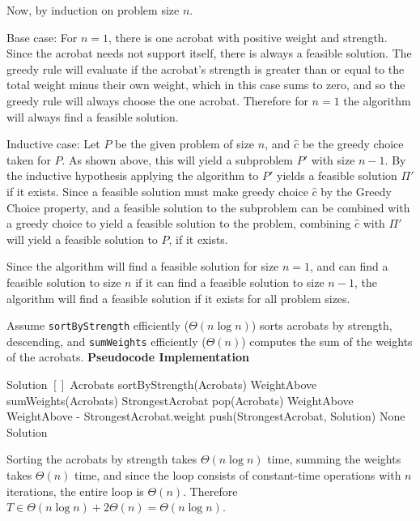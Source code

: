 \documentclass[11pt]{article}
\begin{document}
Now, by induction on problem size $n$. 

Base case: For $n=1$, there is one acrobat with positive weight and strength. Since the acrobat needs not support itself, there is always a feasible solution. The greedy rule will evaluate if the acrobat's strength is greater than or equal to the total weight minus their own weight, which in this case sums to zero, and so the greedy rule will always choose the one acrobat. Therefore for $n=1$ the algorithm will always find a feasible solution.

Inductive case: Let $P$ be the given problem of size $n$, and $\hat{c}$ be the greedy choice taken for $P$. As shown above, this will yield a subproblem $P'$ with size $n-1$. By the inductive hypothesis applying the algorithm to $P'$ yields a feasible solution $\Pi'$ if it exists. Since a feasible solution must make greedy choice $\hat{c}$ by the Greedy Choice property, and a feasible solution to the subproblem can be combined with a greedy choice to yield a feasible solution to the problem, combining $\hat{c}$ with $\Pi'$ will yield a feasible solution to $P$, if it exists. 

Since the algorithm will find a feasible solution for size $n=1$, and can find a feasible solution to size $n$ if it can find a feasible solution to size $n-1$, the algorithm will find a feasible solution if it exists for all problem sizes.

Assume \texttt{sortByStrength} efficiently ($\Theta(n\log n)$) sorts acrobats by strength, descending, and \texttt{sumWeights} efficiently ($\Theta(n)$) computes the sum of the weights of the acrobats.
\textbf{Pseudocode Implementation}

\begin{algorithm}[H]
\begin{algorithmic}
\State Solution \gets $[]$
\State Acrobats \gets sortByStrength(Acrobats) 
\State WeightAbove \gets sumWeights(Acrobats)
    \State StrongestAcrobat \gets pop(Acrobats)
    \State WeightAbove \gets WeightAbove - StrongestAcrobat.weight 
        \State push(StrongestAcrobat, Solution) 
    \Else  
        \State \Return None 
    \EndIf
\EndFor
\State \Return Solution
\end{algorithmic}
\end{algorithm}

Sorting the acrobats by strength takes $\Theta(n\log n)$ time, summing the weights takes $\Theta(n)$ time, and since the loop consists of constant-time operations with $n$ iterations, the entire loop is $\Theta(n)$. Therefore $T \in \Theta(n \log n) + 2\Theta (n) = \Theta(n \log n)$.
\end{document}
